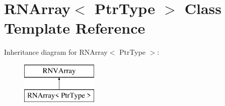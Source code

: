 \hypertarget{class_r_n_array}{}\section{R\+N\+Array$<$ Ptr\+Type $>$ Class Template Reference}
\label{class_r_n_array}
Inheritance diagram for R\+N\+Array$<$ Ptr\+Type $>$\+:\begin{figure}[H]
\begin{center}
\leavevmode
\includegraphics[height=2.000000cm]{class_r_n_array}
\end{center}
\end{figure}
